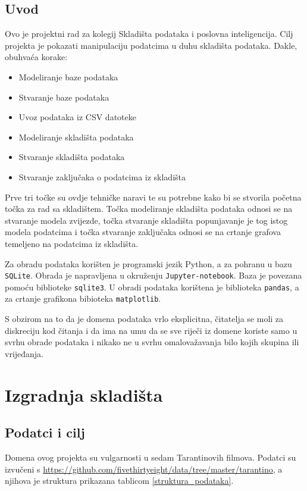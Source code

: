 \documentclass[11pt]{foi}
\begin{document}
\chapter{Uvod}

Ovo je projektni rad za kolegij Skladišta podataka i poslovna inteligencija.
Cilj projekta je pokazati manipulaciju podatcima u duhu skladišta podataka.
Dakle, obuhvaća korake:
\begin{itemize}
	\item Modeliranje baze podataka
	\item Stvaranje baze podataka
	\item Uvoz podataka iz CSV datoteke
	\item Modeliranje skladišta podataka
	\item Stvaranje skladišta podataka
	\item Stvaranje zaključaka o podatcima iz skladišta
\end{itemize}

Prve tri točke su ovdje tehničke naravi te su potrebne kako bi se stvorila
početna točka za rad sa skladištem. Točka modeliranje skladišta podataka odnosi
se na stvaranje  modela zvijezde, točka stvaranje skladišta popunjavanje je tog
istog modela podatcima i točka stvaranje zaključaka odnosi se na crtanje
grafova temeljeno na podatcima iz skladišta.

Za obradu podataka korišten je programski jezik Python, a za pohranu u bazu
\texttt{SQLite}. Obrada je napravljena u okruženju \texttt{Jupyter-notebook}.
Baza je povezana pomoću biblioteke \texttt{sqlite3}. U obradi podataka
korištena je biblioteka \texttt{pandas}, a za crtanje grafikona bibioteka
\texttt{matplotlib}.

S obzirom na to da je domena podataka vrlo eksplicitna, čitatelja se moli za
diskreciju kod čitanja i da ima na umu da se sve riječi iz domene koriste samo
u svrhu obrade podataka i nikako ne u svrhu omalovažavanja bilo kojih skupina
ili vrijeđanja.


\part{Izgradnja skladišta}

\chapter{Podatci i cilj}

Domena ovog projekta su vulgarnosti u sedam Tarantinovih filmova. Podatci su
izvučeni s \url{https://github.com/fivethirtyeight/data/tree/master/tarantino},
a njihova je struktura prikazana tablicom \ref{struktura_podataka}.
\end{document}
